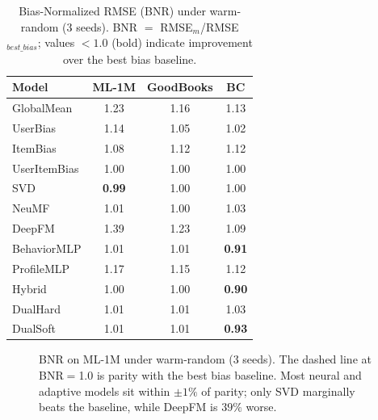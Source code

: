 \documentclass[journal]{IEEEtran}
\begin{document}
\begin{table}[!t]
\centering
\caption{Bias-Normalized RMSE (BNR) under warm-random (3 seeds). BNR $=$ RMSE$_m$/RMSE$_{best\_bias}$; values $<1.0$ (bold) indicate improvement over the best bias baseline.}
\label{tab:bnr}
\footnotesize
\begin{tabular}{@{}lccc@{}}
\toprule
Model & {ML-1M} & {GoodBooks} & {BC} \\
\midrule
GlobalMean    & 1.23 & 1.16 & 1.13 \\
UserBias      & 1.14 & 1.05 & 1.02 \\
ItemBias      & 1.08 & 1.12 & 1.12 \\
UserItemBias  & 1.00 & 1.00 & 1.00 \\
SVD           & \textbf{0.99} & 1.00 & 1.00 \\
NeuMF         & 1.01 & 1.00 & 1.03 \\
DeepFM        & 1.39 & 1.23 & 1.09 \\
BehaviorMLP   & 1.01 & 1.01 & \textbf{0.91} \\
ProfileMLP    & 1.17 & 1.15 & 1.12 \\
Hybrid        & 1.00 & 1.00 & \textbf{0.90} \\
DualHard      & 1.01 & 1.01 & 1.03 \\
DualSoft      & 1.01 & 1.01 & \textbf{0.93} \\
\bottomrule
\end{tabular}
\end{table}

\begin{figure}[!t]
\centering
{}
\caption{BNR on ML-1M under warm-random (3 seeds). The dashed line at BNR$=$1.0 is parity with the best bias baseline. Most neural and adaptive models sit within $\pm1\%$ of parity; only SVD marginally beats the baseline, while DeepFM is $39\%$ worse.}
\label{fig:bnr}
\end{figure}
\end{document}
